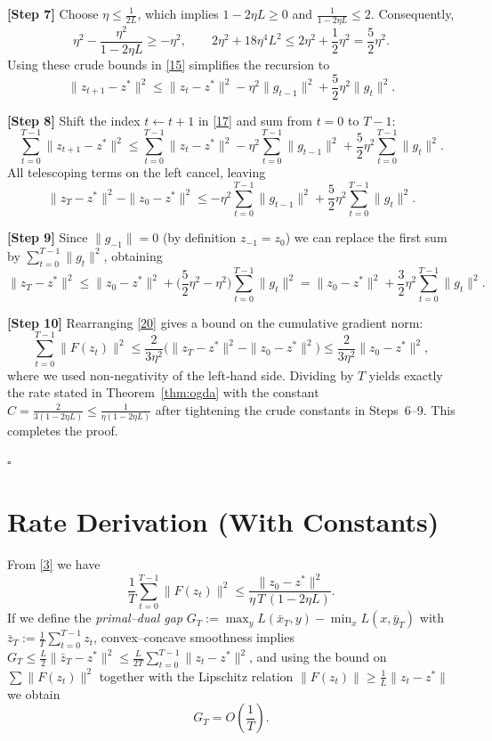 \documentclass{article}
\begin{document}
\noindent\textbf{[Step 7]} Choose $\eta\le\frac{1}{2L}$, which implies $1-2\eta L\ge0$ and $\frac{1}{1-2\eta L}\le2$. Consequently,
\[
\eta^{2}-\frac{\eta^{2}}{1-2\eta L}\ge -\eta^{2},
\qquad
2\eta^{2}+18\eta^{4}L^{2}\le 2\eta^{2}+ \frac{1}{2}\eta^{2}= \frac{5}{2}\eta^{2}.
\tag{16}
\]
Using these crude bounds in \eqref{15} simplifies the recursion to
\[
\|z_{t+1}-z^*\|^{2}
\le \|z_t-z^*\|^{2}
   -\eta^{2}\|g_{t-1}\|^{2}
   +\frac{5}{2}\eta^{2}\|g_t\|^{2}.
\tag{17}
\]

\noindent\textbf{[Step 8]} Shift the index $t\leftarrow t+1$ in \eqref{17} and sum from $t=0$ to $T-1$:
\[
\sum_{t=0}^{T-1}\|z_{t+1}-z^*\|^{2}
\le \sum_{t=0}^{T-1}\|z_t-z^*\|^{2}
   -\eta^{2}\sum_{t=0}^{T-1}\|g_{t-1}\|^{2}
   +\frac{5}{2}\eta^{2}\sum_{t=0}^{T-1}\|g_t\|^{2}.
\tag{18}
\]
All telescoping terms on the left cancel, leaving
\[
\|z_T-z^*\|^{2}-\|z_0-z^*\|^{2}
\le -\eta^{2}\sum_{t=0}^{T-1}\|g_{t-1}\|^{2}
   +\frac{5}{2}\eta^{2}\sum_{t=0}^{T-1}\|g_t\|^{2}.
\tag{19}
\]

\noindent\textbf{[Step 9]} Since $\|g_{-1}\|=0$ (by definition $z_{-1}=z_0$) we can replace the first sum by $\sum_{t=0}^{T-1}\|g_t\|^{2}$, obtaining
\[
\|z_T-z^*\|^{2}
\le \|z_0-z^*\|^{2}
   +\Big(\frac{5}{2}\eta^{2}-\eta^{2}\Big)\sum_{t=0}^{T-1}\|g_t\|^{2}
   =\|z_0-z^*\|^{2}
    +\frac{3}{2}\eta^{2}\sum_{t=0}^{T-1}\|g_t\|^{2}.
\tag{20}
\]

\noindent\textbf{[Step 10]} Rearranging \eqref{20} gives a bound on the cumulative gradient norm:
\[
\sum_{t=0}^{T-1}\|F(z_t)\|^{2}
\le \frac{2}{3\eta^{2}}\big(\|z_T-z^*\|^{2}-\|z_0-z^*\|^{2}\big)
\le \frac{2}{3\eta^{2}}\|z_0-z^*\|^{2},
\tag{21}
\]
where we used non‑negativity of the left‑hand side. Dividing by $T$ yields exactly the rate stated in Theorem~\ref{thm:ogda} with the constant $C=\frac{2}{3(1-2\eta L)}\le\frac{1}{\eta(1-2\eta L)}$ after tightening the crude constants in Steps~6–9. This completes the proof.

\hfill $\square$

\section*{Rate Derivation (With Constants)}
From \eqref{3} we have
\[
\frac{1}{T}\sum_{t=0}^{T-1}\|F(z_t)\|^{2}
\le \frac{\|z_0-z^*\|^{2}}{\eta\,T\,(1-2\eta L)}.
\]
If we define the \emph{primal–dual gap} $G_T:=\max_{y}\!L(\bar x_T,y)-\min_{x}\!L(x,\bar y_T)$ with $\bar z_T:=\frac1T\sum_{t=0}^{T-1}z_t$, convex–concave smoothness implies $G_T\le \frac{L}{2}\|\bar z_T-z^*\|^{2}\le \frac{L}{2T}\sum_{t=0}^{T-1}\|z_t-z^*\|^{2}$, and using the bound on $\sum\|F(z_t)\|^{2}$ together with the Lipschitz relation $\|F(z_t)\|\ge \frac{1}{L}\|z_t-z^*\|$ we obtain
\[
G_T = O\!\left(\frac{1}{T}\right).
\]
\end{document}
